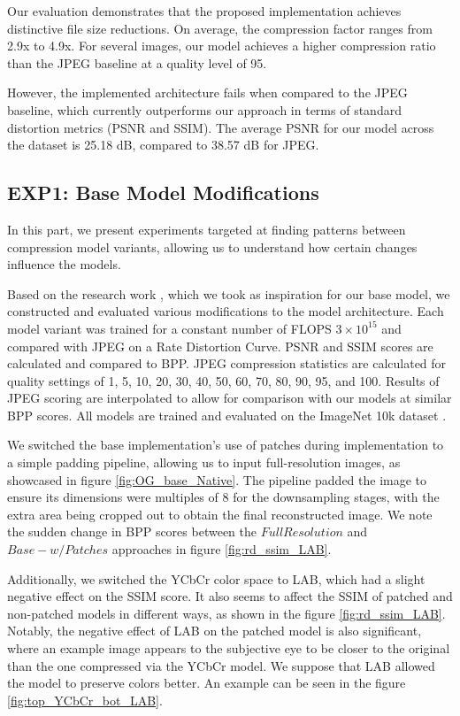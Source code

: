 \documentclass[conference]{IEEEtran}
\begin{document}
Our evaluation demonstrates that the proposed implementation achieves distinctive file size reductions. On average, the compression factor ranges from 2.9x to 4.9x. For several images, our model achieves a higher compression ratio than the JPEG baseline at a quality level of 95. 

However, the implemented architecture fails when compared to the JPEG baseline, which currently outperforms our approach in terms of standard distortion metrics (PSNR and SSIM). The average PSNR for our model across the dataset is 25.18 dB, compared to 38.57 dB for JPEG. 

\subsection{EXP1: Base Model Modifications}
In this part, we present experiments targeted at finding patterns between compression model variants, allowing us to understand how certain changes influence the models.

Based on the research work \cite{cheng_deep_2018}, which we took as inspiration for our base model, we constructed and evaluated various modifications to the model architecture.
Each model variant was trained for a constant number of FLOPS $3 \times 10^{15}$ and compared with JPEG on a Rate Distortion Curve. PSNR and SSIM scores are calculated and compared to BPP. JPEG compression statistics are calculated for quality settings of 1, 5, 10, 20, 30, 40, 50, 60, 70, 80, 90, 95, and 100. Results of JPEG scoring are interpolated to allow for comparison with our models at similar BPP scores. All models are trained and evaluated on the ImageNet 10k dataset \cite{noauthor_imagenet_nodate}.

We switched the base implementation's use of patches during implementation to a simple padding pipeline, allowing us to input full-resolution images, as showcased in figure \ref{fig:OG_base_Native}. The pipeline padded the image to ensure its dimensions were multiples of 8 for the downsampling stages, with the extra area being cropped out to obtain the final reconstructed image. We note the sudden change in BPP scores between the $Full Resolution$ and $Base - w/ Patches$ approaches in figure \ref{fig:rd_ssim_LAB}. 

Additionally, we switched the YCbCr color space to LAB, which had a slight negative effect on the SSIM score. It also seems to affect the SSIM of patched and non-patched models in different ways, as shown in the figure \ref{fig:rd_ssim_LAB}. Notably, the negative effect of LAB on the patched model is also significant, where an example image appears to the subjective eye to be closer to the original than the one compressed via the YCbCr model. We suppose that LAB allowed the model to preserve colors better. An example can be seen in the figure \ref{fig:top_YCbCr_bot_LAB}. 
\end{document}
